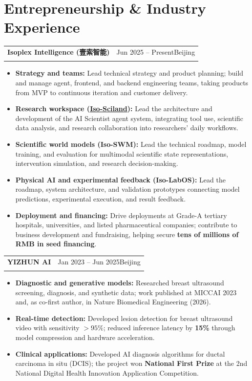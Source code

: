\documentclass[10pt,a4paper]{article}
\makeatletter
\newcommand{\entry}[3]{%
  \needspace{4\baselineskip}%
  \begin{tabularx}{\linewidth}{@{}>{\raggedright\arraybackslash}X r@{}}%
    \textbf{#1} & {\small\color{muted}#2}\\[-1pt]
    \multicolumn{2}{@{}l@{}}{{\small\color{muted}#3}}
  \end{tabularx}\par\vspace{1pt}}
\makeatother
\begin{document}
\section{Entrepreneurship \& Industry Experience}
\entry{Isoplex Intelligence (壹索智能)}{Jun 2025 -- Present\quad Beijing}{Co-founder \& CTO\quad\textbar\quad 北京壹索智能科技有限公司}
\begin{itemize}
  \item \textbf{Strategy and teams:} Lead technical strategy and product planning; build and manage agent, frontend, and backend engineering teams, taking products from MVP to continuous iteration and customer delivery.
  \item \textbf{Research workspace (\href{https://www.sciland.cn/}{Iso-Sciland}):} Lead the architecture and development of the AI Scientist agent system, integrating tool use, scientific data analysis, and research collaboration into researchers' daily workflows.
  \item \textbf{Scientific world models (Iso-SWM):} Lead the technical roadmap, model training, and evaluation for multimodal scientific state representations, intervention simulation, and research decision-making.
  \item \textbf{Physical AI and experimental feedback (Iso-LabOS):} Lead the roadmap, system architecture, and validation prototypes connecting model predictions, experimental execution, and result feedback.
  \item \textbf{Deployment and financing:} Drive deployments at Grade-A tertiary hospitals, universities, and listed pharmaceutical companies; contribute to business development and fundraising, helping secure \textbf{tens of millions of RMB in seed financing}.
\end{itemize}

\vspace{4pt}
\entry{YIZHUN AI}{Jan 2023 -- Jun 2025\quad Beijing}{Algorithm Research Intern}
\begin{itemize}
  \item \textbf{Diagnostic and generative models:} Researched breast ultrasound screening, diagnosis, and synthetic data; work published at MICCAI 2023 and, as co-first author, in Nature Biomedical Engineering (2026).
  \item \textbf{Real-time detection:} Developed lesion detection for breast ultrasound video with sensitivity $>95\%$; reduced inference latency by \textbf{15\%} through model compression and hardware acceleration.
  \item \textbf{Clinical applications:} Developed AI diagnosis algorithms for ductal carcinoma in situ (DCIS); the project won \textbf{National First Prize} at the 2nd National Digital Health Innovation Application Competition.
\end{itemize}
\end{document}
